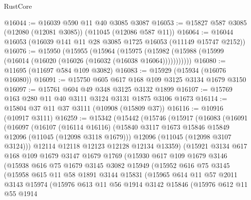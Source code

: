 \begin{lexlean}{RustCore}
\begin{coremodule}
@16044 := @16039 @590 @11 @40 @3085 @3087
@16053 := @15827 @587 @3085 (@12080 (@12081 @3085)) (@11045 (@12086 @587 @11))
@16064 := @16044 @16053 (@16039 @141 @11 @28 @3085 @1725 @16053 (@11149 @15747 @2152))
@16076 := @15950
    (@15955
      (@15964
        (@15975 (@15982 (@15988 (@15999 (@16014 (@16020 (@16026 (@16032 (@16038 @16064)))))))))))
@16080 := @11695 (@11697 @584 @109 @3082)
@16083 := @15929 (@15934 (@16076 @16080))
@16091 := @15750 @605 @617 @168 @109 @3125 @3134 @1679 @3150
@16097 := @15761 @604 @49 @348 @3125 @3132 @1899
@16107 := @15769 @163 @280 @11 @40 @3111 @3124 @3131 @1875 @3106 @1673
@16114 := @15804 @37 @11 @37 @3111 (@10908 (@15809 @37))
@16116 := @10916 (@10917 @3111)
@16259 := @15342
    (@15442
      (@15746
        (@15917
          (@16083
            (@16091
              (@16097
                (@16107
                  (@16114 @16116)
                  (@15840 @3117 @1673 @15846 @15849 @12096 (@11045 (@12098 @3118 @1679)))
                  @12096
                  (@11045 (@12098 @3107 @3124)))
                @12114
                @12118
                @12123
                @12128
                @12134
                @13359)
              (@15921
                @3134
                @617
                @168
                @109
                @1679
                @3147
                @1679
                @1769
                (@15930
                  @617
                  @109
                  @1679
                  @3146
                  (@15938
                    @616
                    @75
                    @1679
                    @3145
                    @3082
                    @15949
                    (@15952
                      @616
                      @75
                      @3145
                      (@15958
                        @615
                        @11
                        @58
                        @1891
                        @3144
                        @15831
                        (@15965
                          @614
                          @11
                          @57
                          @2011
                          @3143
                          @15974
                          (@15976
                            @613
                            @11
                            @56
                            @1914
                            @3142
                            @15846
                            (@15976
                              @612
                              @11
                              @55
                              @1914

\end{coremodule}
\end{lexlean}
